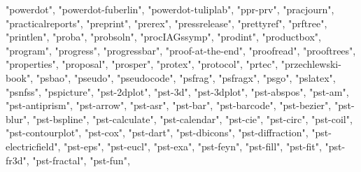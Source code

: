 \documentclass[
]{article}
\newenvironment{Shaded}{\begin{snugshade}}{\end{snugshade}}
\newcommand{\NormalTok}[1]{#1}
\newcommand{\StringTok}[1]{\textcolor[rgb]{0.31,0.60,0.02}{#1}}
\begin{document}
\begin{Shaded}
\begin{Highlighting}[]
\StringTok{"powerdot"}\NormalTok{, }\StringTok{"powerdot{-}fuberlin"}\NormalTok{, }\StringTok{"powerdot{-}tuliplab"}\NormalTok{, }\StringTok{"ppr{-}prv"}\NormalTok{, }
\StringTok{"pracjourn"}\NormalTok{, }\StringTok{"practicalreports"}\NormalTok{, }\StringTok{"preprint"}\NormalTok{, }\StringTok{"prerex"}\NormalTok{, }\StringTok{"pressrelease"}\NormalTok{, }
\StringTok{"prettyref"}\NormalTok{, }\StringTok{"prftree"}\NormalTok{, }\StringTok{"printlen"}\NormalTok{, }\StringTok{"proba"}\NormalTok{, }\StringTok{"probsoln"}\NormalTok{, }\StringTok{"procIAGssymp"}\NormalTok{, }
\StringTok{"prodint"}\NormalTok{, }\StringTok{"productbox"}\NormalTok{, }\StringTok{"program"}\NormalTok{, }\StringTok{"progress"}\NormalTok{, }\StringTok{"progressbar"}\NormalTok{, }
\StringTok{"proof{-}at{-}the{-}end"}\NormalTok{, }\StringTok{"proofread"}\NormalTok{, }\StringTok{"prooftrees"}\NormalTok{, }\StringTok{"properties"}\NormalTok{, }
\StringTok{"proposal"}\NormalTok{, }\StringTok{"prosper"}\NormalTok{, }\StringTok{"protex"}\NormalTok{, }\StringTok{"protocol"}\NormalTok{, }\StringTok{"prtec"}\NormalTok{, }\StringTok{"przechlewski{-}book"}\NormalTok{, }
\StringTok{"psbao"}\NormalTok{, }\StringTok{"pseudo"}\NormalTok{, }\StringTok{"pseudocode"}\NormalTok{, }\StringTok{"psfrag"}\NormalTok{, }\StringTok{"psfragx"}\NormalTok{, }\StringTok{"psgo"}\NormalTok{, }
\StringTok{"pslatex"}\NormalTok{, }\StringTok{"psnfss"}\NormalTok{, }\StringTok{"pspicture"}\NormalTok{, }\StringTok{"pst{-}2dplot"}\NormalTok{, }\StringTok{"pst{-}3d"}\NormalTok{, }\StringTok{"pst{-}3dplot"}\NormalTok{, }
\StringTok{"pst{-}abspos"}\NormalTok{, }\StringTok{"pst{-}am"}\NormalTok{, }\StringTok{"pst{-}antiprism"}\NormalTok{, }\StringTok{"pst{-}arrow"}\NormalTok{, }\StringTok{"pst{-}asr"}\NormalTok{, }
\StringTok{"pst{-}bar"}\NormalTok{, }\StringTok{"pst{-}barcode"}\NormalTok{, }\StringTok{"pst{-}bezier"}\NormalTok{, }\StringTok{"pst{-}blur"}\NormalTok{, }\StringTok{"pst{-}bspline"}\NormalTok{, }
\StringTok{"pst{-}calculate"}\NormalTok{, }\StringTok{"pst{-}calendar"}\NormalTok{, }\StringTok{"pst{-}cie"}\NormalTok{, }\StringTok{"pst{-}circ"}\NormalTok{, }\StringTok{"pst{-}coil"}\NormalTok{, }
\StringTok{"pst{-}contourplot"}\NormalTok{, }\StringTok{"pst{-}cox"}\NormalTok{, }\StringTok{"pst{-}dart"}\NormalTok{, }\StringTok{"pst{-}dbicons"}\NormalTok{, }\StringTok{"pst{-}diffraction"}\NormalTok{, }
\StringTok{"pst{-}electricfield"}\NormalTok{, }\StringTok{"pst{-}eps"}\NormalTok{, }\StringTok{"pst{-}eucl"}\NormalTok{, }\StringTok{"pst{-}exa"}\NormalTok{, }\StringTok{"pst{-}feyn"}\NormalTok{, }
\StringTok{"pst{-}fill"}\NormalTok{, }\StringTok{"pst{-}fit"}\NormalTok{, }\StringTok{"pst{-}fr3d"}\NormalTok{, }\StringTok{"pst{-}fractal"}\NormalTok{, }\StringTok{"pst{-}fun"}\NormalTok{, }

\end{Highlighting}
\end{Shaded}
\end{document}
